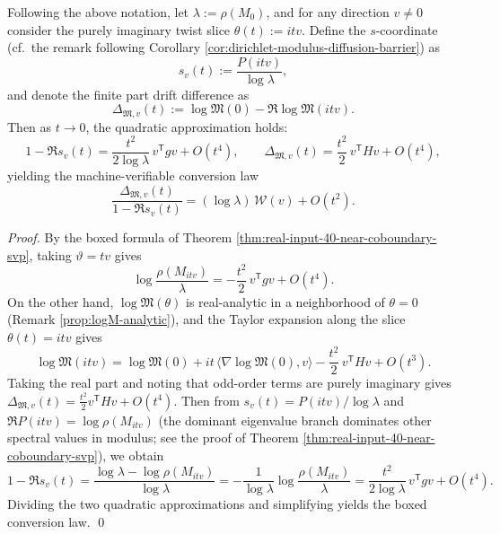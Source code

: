 \begin{proposition}\label{prop:real-input-40-space-time-conversion-law}
Following the above notation, let \(\lambda:=\rho(M_0)\), and for any direction \(v\neq 0\) consider the purely imaginary twist slice
\(
\theta(t):=i t v
\).
Define the \(s\)-coordinate (cf.\ the remark following Corollary \ref{cor:dirichlet-modulus-diffusion-barrier}) as
\[
s_v(t):=\frac{P(itv)}{\log\lambda},
\]
and denote the finite part drift difference as
\[
\Delta_{\mathfrak{M},v}(t)
:=\log\mathfrak{M}(0)-\Re\log\mathfrak{M}(itv).
\]
Then as \(t\to 0\), the quadratic approximation holds:
\[
1-\Re s_v(t)=\frac{t^2}{2\log\lambda}\,v^{\mathsf T}gv+O(t^4),
\qquad
\Delta_{\mathfrak{M},v}(t)=\frac{t^2}{2}\,v^{\mathsf T}Hv+O(t^4),
\]
yielding the machine-verifiable conversion law
\[
\boxed{\;
\frac{\Delta_{\mathfrak{M},v}(t)}{1-\Re s_v(t)}
=(\log\lambda)\,\mathcal{W}(v)+O(t^2).\;}
\]
\end{proposition}
\begin{proof}
By the boxed formula of Theorem \ref{thm:real-input-40-near-coboundary-svp}, taking \(\vartheta=t v\) gives
\[
\log\frac{\rho(M_{itv})}{\lambda}
=-\frac{t^2}{2}\,v^{\mathsf T}gv+O(t^4).
\]
On the other hand, \(\log\mathfrak{M}(\theta)\) is real-analytic in a neighborhood of \(\theta=0\) (Remark \ref{prop:logM-analytic}), and the Taylor expansion along the slice \(\theta(t)=itv\) gives
\[
\log\mathfrak{M}(itv)
=\log\mathfrak{M}(0)+it\,\langle\nabla\log\mathfrak{M}(0),v\rangle-\frac{t^2}{2}\,v^{\mathsf T}Hv+O(t^3).
\]
Taking the real part and noting that odd-order terms are purely imaginary gives
\(
\Delta_{\mathfrak{M},v}(t)=\frac{t^2}{2}v^{\mathsf T}Hv+O(t^4)
\).
Then from \(s_v(t)=P(itv)/\log\lambda\) and \(\Re P(itv)=\log\rho(M_{itv})\) (the dominant eigenvalue branch dominates other spectral values in modulus; see the proof of Theorem \ref{thm:real-input-40-near-coboundary-svp}), we obtain
\[
1-\Re s_v(t)
=\frac{\log\lambda-\log\rho(M_{itv})}{\log\lambda}
=-\frac{1}{\log\lambda}\log\frac{\rho(M_{itv})}{\lambda}
=\frac{t^2}{2\log\lambda}\,v^{\mathsf T}gv+O(t^4).
\]
Dividing the two quadratic approximations and simplifying yields the boxed conversion law. \qed
\end{proof}

